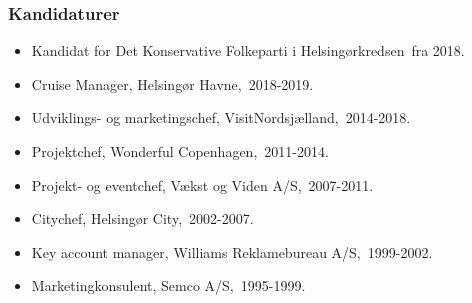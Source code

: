 \documentclass[11pt, a4paper]{awesome-cv}
\begin{document}
\begin{cvletter}
\subsubsection*{Kandidaturer}
\begin{itemize}
\item Kandidat for Det Konservative Folkeparti i Helsingørkredsen fra 2018.
\end{itemize}
\begin{itemize}
\item Cruise Manager, Helsingør Havne, 2018-2019.
\item Udviklings- og marketingschef, VisitNordsjælland, 2014-2018.
\item Projektchef, Wonderful Copenhagen, 2011-2014.
\item Projekt- og eventchef, Vækst og Viden A/S, 2007-2011.
\item Citychef, Helsingør City, 2002-2007.
\item Key account manager, Williams Reklamebureau A/S, 1999-2002.
\item Marketingkonsulent, Semco A/S, 1995-1999.
\end{itemize}
\end{cvletter}
\end{document}
